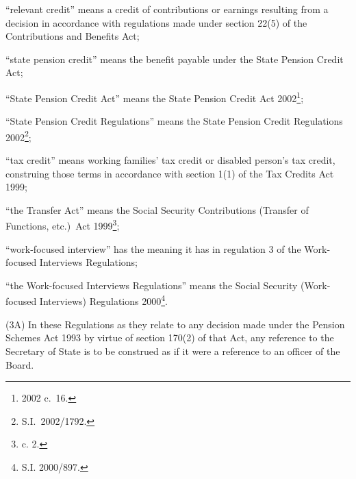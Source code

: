 \documentclass[12pt,a4paper]{article}
\begin{document}
\begin{enumerate}
“relevant credit” means a credit of contributions or earnings resulting from a decision in accordance with regulations made under section 22(5) of the Contributions and Benefits Act;

“state pension credit” means the benefit payable under the State Pension Credit Act;

“State Pension Credit Act” means the State Pension Credit Act 2002\footnote{2002 c.\ 16.};

“State Pension Credit Regulations” means the State Pension Credit Regulations 2002\footnote{S.I.\ 2002/1792.};

“tax credit” means working families' tax credit or disabled person’s tax credit, construing those terms in accordance with section 1(1) of the Tax Credits Act 1999;

“the Transfer Act” means the Social Security Contributions (Transfer of Functions, etc.)\ Act 1999\footnote{ c. 2.};


“work-focused interview” has the meaning it has in regulation 3 of the Work-focused Interviews Regulations;

\pagebreak[3]

    “the Work-focused Interviews Regulations” means the Social Security (Work-focused Interviews) Regulations 2000\footnote{\frenchspacing S.I. 2000/897.}.
\end{enumerate}

(3A) In these Regulations as they relate to any decision made under the Pension Schemes Act 1993 by virtue of section 170(2) of that Act, any reference to the Secretary of State is to be construed as if it were a reference to an officer of the Board.
\end{document}

